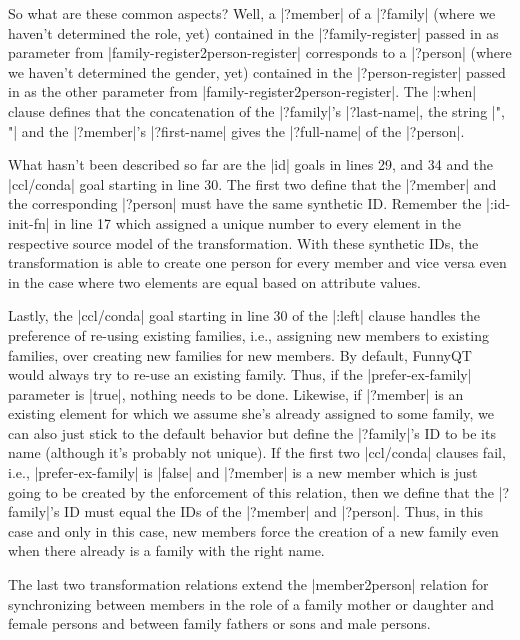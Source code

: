 \documentclass[a4paper]{article}
\newcommand{\code}{\clojureinline}
\begin{document}
So what are these common aspects?  Well, a \code|?member| of a \code|?family|
(where we haven't determined the role, yet) contained in the
\code|?family-register| passed in as parameter from
\code|family-register2person-register| corresponds to a \code|?person| (where
we haven't determined the gender, yet) contained in the \code|?person-register|
passed in as the other parameter from \code|family-register2person-register|.
The \code|:when| clause defines that the concatenation of the \code|?family|'s
\code|?last-name|, the string \code|", "| and the \code|?member|'s
\code|?first-name| gives the \code|?full-name| of the \code|?person|.

What hasn't been described so far are the \code|id| goals in lines 29, and 34
and the \code|ccl/conda| goal starting in line 30.  The first two define that
the \code|?member| and the corresponding \code|?person| must have the same
synthetic ID.  Remember the \code|:id-init-fn| in line 17 which assigned a
unique number to every element in the respective source model of the
transformation.  With these synthetic IDs, the transformation is able to create
one person for every member and vice versa even in the case where two elements
are equal based on attribute values.

Lastly, the \code|ccl/conda| goal starting in line 30 of the \code|:left|
clause handles the preference of re-using existing families, i.e., assigning
new members to existing families, over creating new families for new members.
By default, FunnyQT would always try to re-use an existing family.  Thus, if
the \code|prefer-ex-family| parameter is \code|true|, nothing needs to be done.
Likewise, if \code|?member| is an existing element for which we assume she's
already assigned to some family, we can also just stick to the default behavior
but define the \code|?family|'s ID to be its name (although it's probably not
unique).  If the first two \code|ccl/conda| clauses fail, i.e.,
\code|prefer-ex-family| is \code|false| and \code|?member| is a new member
which is just going to be created by the enforcement of this relation, then we
define that the \code|?family|'s ID must equal the IDs of the \code|?member|
and \code|?person|.  Thus, in this case and only in this case, new members
force the creation of a new family even when there already is a family with the
right name.

The last two transformation relations extend the \code|member2person| relation
for synchronizing between members in the role of a family mother or daughter
and female persons and between family fathers or sons and male persons.
\end{document}
